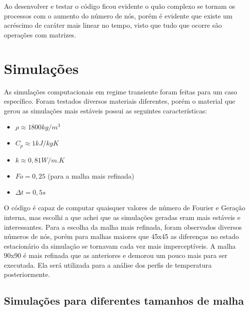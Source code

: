 \documentclass[article]{abntex2}
\begin{document}
Ao desenvolver e testar o código ficou evidente o quão complexo se tornam os processos com o aumento do número de nós, porém é evidente que existe um acréscimo de caráter mais linear no tempo, visto que tudo que ocorre são operações com matrizes.

\section{Simulações}
As simulações computacionais em regime transiente foram feitas para um caso específico. Foram testados diversos materiais diferentes, porém o material que gerou as simulações mais estáveis possui as seguintes características: 

\begin{itemize}
    \item $\rho \approx 1800kg/m^3$ 
    \item $C_{p} \approx 1kJ/kgK$
    \item $k \approx 0,81W/m.K$
    \item $Fo= 0,25$ (para a malha mais refinada)
    \item $\Delta t= 0,5s$
\end{itemize}

O código é capaz de computar quaisquer valores de número de Fourier e Geração interna, mas escolhi a que achei que as simulações geradas eram mais estáveis e interessantes.
Para a escolha da malha mais refinada, foram observados diversos números de nós, porém para malhas maiores que 45x45 as diferenças no estado estacionário da simulação se tornavam cada vez mais imperceptíveis. A malha 90x90 é mais refinada que as anteriores e demorou um pouco mais para ser executada. Ela será utilizada para a análise dos perfis de temperatura posteriormente.

\subsection{Simulações para diferentes tamanhos de malha}
\end{document}
